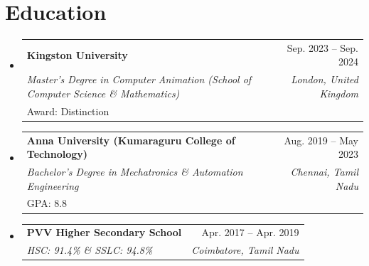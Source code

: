 \documentclass[a4paper,10pt]{article}
\makeatletter
\newcommand{\resumeSubheading}[4]{
  \vspace{-2pt}\item
  \begin{tabular*}{0.97\textwidth}[t]{l@{\extracolsep{\fill}}r}
    \textbf{#1} & #2 \\
    \textit{\small#3} & \textit{\small #4} \\
  \end{tabular*}\vspace{-3pt}
}
\newcommand{\resumeEducationHeading}[5]{
  \vspace{-2pt}\item
  \begin{tabular*}{0.97\textwidth}[t]{l@{\extracolsep{\fill}}r}
    \textbf{#1} & #2 \\
    \textit{\small#3} & \textit{\small #4} \\
    \small #5 & \\
  \end{tabular*}\vspace{-3pt}
}
\newenvironment{resumeSubHeadingList}{\begin{itemize}[leftmargin=0.15in, label={}]}{\end{itemize}}
\makeatother
\begin{document}
\section{Education}
\begin{resumeSubHeadingList}
  \resumeEducationHeading
    {Kingston University}{Sep. 2023 -- Sep. 2024}
    {Master's Degree in Computer Animation (School of Computer Science \& Mathematics)}{London, United Kingdom}
    {Award: Distinction}

  \resumeEducationHeading
    {Anna University (Kumaraguru College of Technology)}{Aug. 2019 -- May 2023}
    {Bachelor's Degree in Mechatronics \& Automation Engineering}{Chennai, Tamil Nadu}
    {GPA: 8.8}

  \resumeSubheading
    {PVV Higher Secondary School}{Apr. 2017 -- Apr. 2019}
    {\textup{HSC: 91.4\% \& SSLC: 94.8\%}}{Coimbatore, Tamil Nadu}
\end{resumeSubHeadingList}

\end{document}
